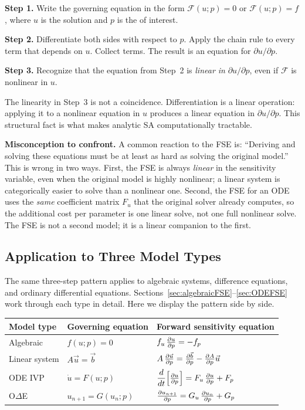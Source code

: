 \textbf{Step 1.} Write the governing equation in the form
$\mathcal{F}(u; p) = 0$ or $\mathcal{F}(u; p) = f$, where $u$
is the solution and $p$ is the \POI of interest.

\textbf{Step 2.} Differentiate both sides with respect to $p$.
Apply the chain rule to every term that depends on $u$.
Collect terms. The result is an equation for $\partial u/\partial p$.

\textbf{Step 3.} Recognize that the equation from Step~2 is
\emph{linear in} $\partial u/\partial p$, even if $\mathcal{F}$
is nonlinear in $u$.

The linearity in Step~3 is not a coincidence. Differentiation is
a linear operation: applying it to a nonlinear equation in $u$
produces a linear equation in $\partial u/\partial p$.
This structural fact is what makes analytic SA computationally tractable.

\medskip
\noindent\textbf{Misconception to confront.} A common reaction to
the FSE is: ``Deriving and solving these equations must be at least
as hard as solving the original model.'' This is wrong in two ways.
First, the FSE is always \emph{linear} in the sensitivity variable,
even when the original model is highly nonlinear; a linear system
is categorically easier to solve than a nonlinear one.
Second, the FSE for an ODE uses the \emph{same} coefficient matrix
$F_u$ that the original solver already computes, so the additional
cost per parameter is one linear solve, not one full nonlinear solve.
The FSE is not a second model; it is a linear companion to the first.
\medskip

\subsection{Application to Three Model Types}

The same three-step pattern applies to algebraic systems,
difference equations, and ordinary differential equations.
Sections~\ref{sec:algebraicFSE}--\ref{sec:ODEFSE}
work through each type in detail.
Here we display the pattern side by side.

\begin{center}
\renewcommand{\arraystretch}{1.5}
\begin{tabular}{lll}
\toprule
Model type & Governing equation & Forward sensitivity equation \\
\midrule
Algebraic & $f(u;p) = 0$ & $f_u\,\frac{\partial u}{\partial p} = -f_p$ \\[2pt]
Linear system & $A\vec{u} = \vec{b}$ &
  $A\,\frac{\partial \vec{u}}{\partial p} = \frac{\partial \vec{b}}{\partial p} - \frac{\partial A}{\partial p}\vec{u}$ \\[2pt]
ODE IVP & $\dot{u} = F(u;p)$ &
  $\dfrac{d}{dt}\!\left[\frac{\partial u}{\partial p}\right] = F_u\,\frac{\partial u}{\partial p} + F_p$ \\[6pt]
O$\Delta$E & $u_{n+1} = G(u_n;p)$ &
  $\frac{\partial u_{n+1}}{\partial p} = G_u\,\frac{\partial u_n}{\partial p} + G_p$ \\
\bottomrule
\end{tabular}
\end{center}

